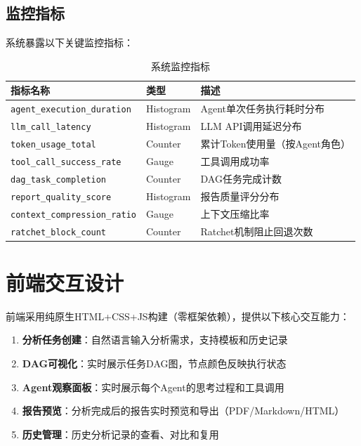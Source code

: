 \documentclass[12pt,a4paper]{ctexrep}
\begin{document}
\subsection{监控指标}

系统暴露以下关键监控指标：

\begin{table}[H]
\centering
\caption{系统监控指标}
\label{tab:metrics}
{\small
\begin{tabular}{p{4.5cm} p{2cm} p{6.5cm}}
\toprule
\textbf{指标名称} & \textbf{类型} & \textbf{描述} \\
\midrule
\texttt{agent\_execution\_duration} & Histogram & Agent单次任务执行耗时分布 \\
\texttt{llm\_call\_latency} & Histogram & LLM API调用延迟分布 \\
\texttt{token\_usage\_total} & Counter & 累计Token使用量（按Agent角色） \\
\texttt{tool\_call\_success\_rate} & Gauge & 工具调用成功率 \\
\texttt{dag\_task\_completion} & Counter & DAG任务完成计数 \\
\texttt{report\_quality\_score} & Histogram & 报告质量评分分布 \\
\texttt{context\_compression\_ratio} & Gauge & 上下文压缩比率 \\
\texttt{ratchet\_block\_count} & Counter & Ratchet机制阻止回退次数 \\
\bottomrule
\end{tabular}
}
\end{table}

\section{前端交互设计}

前端采用纯原生HTML+CSS+JS构建（零框架依赖），提供以下核心交互能力：

\begin{enumerate}[leftmargin=2em]
\item \textbf{分析任务创建}：自然语言输入分析需求，支持模板和历史记录
\item \textbf{DAG可视化}：实时展示任务DAG图，节点颜色反映执行状态
\item \textbf{Agent观察面板}：实时展示每个Agent的思考过程和工具调用
\item \textbf{报告预览}：分析完成后的报告实时预览和导出（PDF/Markdown/HTML）
\item \textbf{历史管理}：历史分析记录的查看、对比和复用
\end{enumerate}
\end{document}
